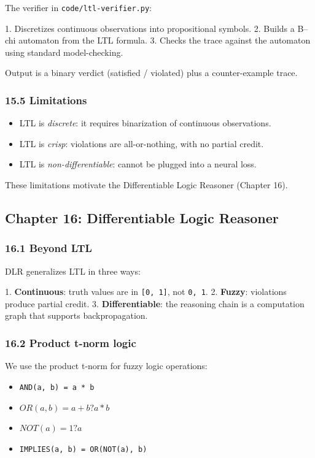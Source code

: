 \documentclass[11pt]{article}
\begin{document}
The verifier in \texttt{code/ltl-verifier.py}:

1. Discretizes continuous observations into propositional symbols.
2. Builds a B--chi automaton from the LTL formula.
3. Checks the trace against the automaton using standard model-checking.

Output is a binary verdict (satisfied / violated) plus a counter-example trace.

\subsubsection{15.5 Limitations}

\begin{itemize}
  \item LTL is \textit{discrete}: it requires binarization of continuous observations.
  \item LTL is \textit{crisp}: violations are all-or-nothing, with no partial credit.
  \item LTL is \textit{non-differentiable}: cannot be plugged into a neural loss.
\end{itemize}


These limitations motivate the Differentiable Logic Reasoner (Chapter 16).

\hrulefill

\subsection{Chapter 16: Differentiable Logic Reasoner}

\subsubsection{16.1 Beyond LTL}

DLR generalizes LTL in three ways:

1. \textbf{Continuous}: truth values are in \texttt{[0, 1]}, not \texttt{{0, 1}}.
2. \textbf{Fuzzy}: violations produce partial credit.
3. \textbf{Differentiable}: the reasoning chain is a computation graph that supports
   backpropagation.

\subsubsection{16.2 Product t-norm logic}

We use the product t-norm for fuzzy logic operations:

\begin{itemize}
  \item \texttt{AND(a, b) = a * b}
  \item $OR(a, b) = a + b ?a*b$
  \item $NOT(a) = 1 ?a$
  \item \texttt{IMPLIES(a, b) = OR(NOT(a), b)}
\end{itemize}
\end{document}
